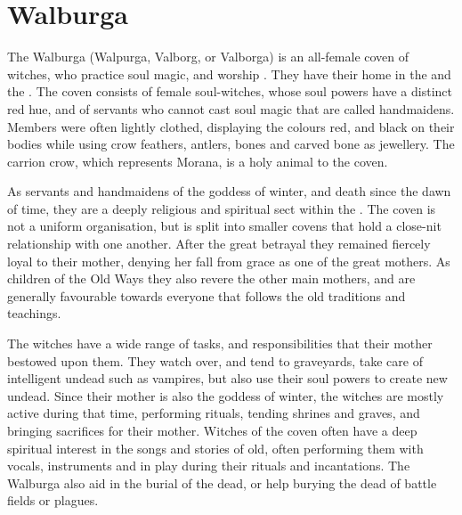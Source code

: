 \ifimages
\clearpage
{}
\clearpage
\fi

\section{Walburga}
\label{sec:Walburga}

The Walburga (Walpurga, Valborg, or Valborga) is an all-female coven of
witches, who practice soul magic, and worship . They have
their home in the  and the
. The coven consists of female soul-witches, whose soul
powers have a distinct red hue, and of servants who cannot cast soul magic
that are called handmaidens. Members were often lightly clothed, displaying
the colours red, and black on their bodies while using crow feathers, antlers,
bones and carved bone as jewellery. The carrion crow, which represents Morana,
is a holy animal to the coven.

As servants and handmaidens of the goddess of winter, and death since the dawn
of time, they are a deeply religious and spiritual sect within the
. The coven is not a uniform organisation, but is
split into smaller covens that hold a close-nit relationship with one another.
After the great betrayal they remained fiercely loyal to their mother, denying
her fall from grace as one of the great mothers. As children of the Old Ways
they also revere the other main mothers, and are generally favourable towards
everyone that follows the old traditions and teachings.

The witches have a wide range of tasks, and responsibilities that their mother
bestowed upon them. They watch over, and tend to graveyards, take care of
intelligent undead such as vampires, but also use their soul powers to create
new undead. Since their mother is also the goddess of winter, the witches are
mostly active during that time, performing rituals, tending shrines and graves,
and bringing sacrifices for their mother. Witches of the coven often have a
deep spiritual interest in the songs and stories of old, often performing them
with vocals, instruments and in play during their rituals and incantations.
The Walburga also aid in the burial of the dead, or help burying the dead of
battle fields or plagues.

